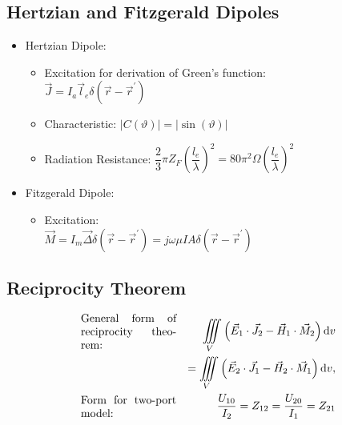\subsection{Hertzian and Fitzgerald Dipoles}
\begin{itemize}
    \itemsep0pt
    \item Hertzian Dipole:
        \begin{itemize}
            \itemsep0pt
            \item Excitation for derivation of Green's function:\\
                \(\vec{J} = I_a \vec{l}_e \delta(\vec{r} - \vec{r}^\prime)\)
            \item Characteristic: \(|C(\vartheta)| = \left|\sin(\vartheta)\right|\)
            \item Radiation Resistance: \(\dfrac{2}{3} \pi Z_F \left(\dfrac{l_e}{\lambda}\right)^2 = 80 \pi^2 \Omega \left(\dfrac{l_e}{\lambda}\right)^2\)
        \end{itemize}
    \item Fitzgerald Dipole:
        \begin{itemize}
            \itemsep0pt
            \item Excitation:\\
                \(\vec{M} = I_m \vec{\Delta} \delta(\vec{r} - \vec{r}^\prime) = j\omega\mu I A \delta(\vec{r} - \vec{r}^\prime)\)
        \end{itemize}
\end{itemize}

\subsection{Reciprocity Theorem}
\begin{align*}
    &\text{\parbox{3cm}{General form of reciprocity theorem:}} &\iiint\limits_V\left(\vec{E}_1 \cdot \vec{J}_2 - \vec{H}_1 \cdot \vec{M}_2\right)\mathrm{d}v\\
    & &= \iiint\limits_V\left(\vec{E}_2 \cdot \vec{J}_1 - \vec{H}_2 \cdot \vec{M}_1\right)\mathrm{d}v,\\
    &\text{\parbox{3cm}{Form for two-port model:}} &\dfrac{U_{10}}{I_2} = Z_{12} = \dfrac{U_{20}}{I_1} = Z_{21}
\end{align*}

